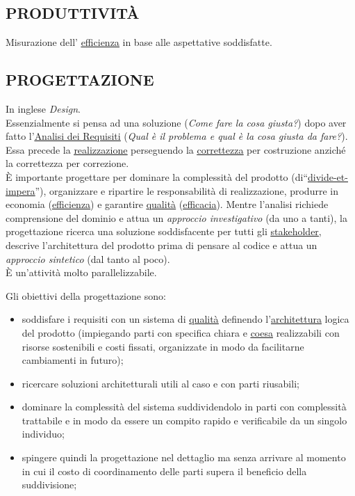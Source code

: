 		\subsection{PRODUTTIVITÀ}  \label{produttivita}
		Misurazione dell' \underline{\hyperref[efficienza]{efficienza}} in base alle aspettative soddisfatte.
		

		\subsection{PROGETTAZIONE}  \label{progettazione} %
		In inglese \textit{Design}. \\
		Essenzialmente si pensa ad una soluzione (\textit{Come fare la cosa giusta?}) dopo aver fatto l'\underline{\hyperref[analisideirequisiti]{Analisi dei Requisiti}} (\textit{Qual è il problema e qual è la cosa giusta da fare?}). Essa precede la \underline{\hyperref[realizzazione]{realizzazione}} perseguendo la \underline{\hyperref[correttezza]{correttezza}} per costruzione anziché la correttezza per correzione. \\
		È importante progettare per dominare la complessità del prodotto (di“\underline{\hyperref[divideetimpera]{divide-et-impera}}”), organizzare e ripartire le responsabilità di realizzazione, produrre in economia (\underline{\hyperref[efficienza]{efficienza}}) e garantire \underline{\hyperref[qualita]{qualità}} (\underline{\hyperref[efficacia]{efficacia}}). Mentre l'analisi richiede comprensione del dominio e attua un \textit{approccio investigativo} (da uno a tanti), la progettazione ricerca una soluzione soddisfacente per tutti gli \underline{\hyperref[stakeholder]{stakeholder}}, descrive l'architettura del prodotto prima di pensare al codice e attua un \textit{approccio sintetico} (dal tanto al poco). \\
		È un'attività molto parallelizzabile.
		
		Gli obiettivi della progettazione sono: 
		\begin{itemize}
			\item soddisfare i requisiti con un sistema di \underline{\hyperref[qualita]{qualità}} definendo l'\underline{\hyperref[architettura]{architettura}} logica del prodotto (impiegando parti con specifica chiara e \underline{\hyperref[coeso]{coesa}} realizzabili con risorse sostenibili e costi fissati, organizzate in modo da facilitarne cambiamenti in futuro);
			\item ricercare soluzioni architetturali utili al caso e con parti riusabili;
			\item  dominare la complessità del sistema suddividendolo in parti con complessità trattabile e in modo da essere un compito rapido e verificabile da un singolo individuo;
			\item spingere quindi la progettazione nel dettaglio ma senza arrivare al momento in cui il costo di coordinamento delle parti supera il beneficio della suddivisione; 
		\end{itemize}
	
